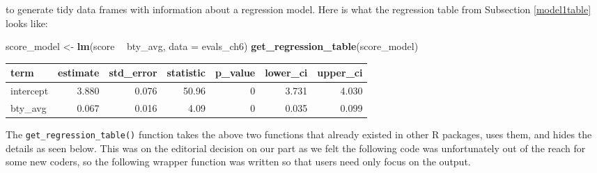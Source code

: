 \documentclass[12pt, krantz2,]{krantz}
\makeatletter
\newenvironment{Shaded}{\begin{snugshade}}{\end{snugshade}}
\newcommand{\DataTypeTok}[1]{\textcolor[rgb]{0.27,0.27,0.27}{#1}}
\newcommand{\DecValTok}[1]{\textcolor[rgb]{0.06,0.06,0.06}{#1}}
\newcommand{\KeywordTok}[1]{\textcolor[rgb]{0.27,0.27,0.27}{\textbf{#1}}}
\newcommand{\NormalTok}[1]{#1}
\newcommand{\OperatorTok}[1]{\textcolor[rgb]{0.43,0.43,0.43}{\textbf{#1}}}
\newcommand{\OtherTok}[1]{\textcolor[rgb]{0.37,0.37,0.37}{#1}}
\newcommand{\StringTok}[1]{\textcolor[rgb]{0.5,0.5,0.5}{#1}}
\newenvironment{kframe}{%
\medskip{}
\setlength{\fboxsep}{.8em}
 \def\at@end@of@kframe{}%
 \ifinner\ifhmode%
  \def\at@end@of@kframe{\end{minipage}}%
  \begin{minipage}{\columnwidth}%
 \fi\fi%
 \def\FrameCommand##1{\hskip\@totalleftmargin \hskip-\fboxsep
 \colorbox{shadecolor}{##1}\hskip-\fboxsep
     \hskip-\linewidth \hskip-\@totalleftmargin \hskip\columnwidth}%
 \MakeFramed {\advance\hsize-\width
   \@totalleftmargin\z@ \linewidth\hsize
   \@setminipage}}%
 {\par\unskip\endMakeFramed%
 \at@end@of@kframe}
\renewenvironment{Shaded}{\begin{kframe}}{\end{kframe}}
\makeatother
\begin{document}
to generate tidy data frames with information about a regression model. Here is what the regression table from Subsection \ref{model1table} looks like:

\begin{Shaded}
\begin{Highlighting}[]
\NormalTok{score_model <-}\StringTok{ }\KeywordTok{lm}\NormalTok{(score }\OperatorTok{~}\StringTok{ }\NormalTok{bty_avg, }\DataTypeTok{data =}\NormalTok{ evals_ch6)}
\KeywordTok{get_regression_table}\NormalTok{(score_model)}
\end{Highlighting}
\end{Shaded}

\begin{table}[H]
\centering\begingroup\fontsize{10}{12}\selectfont

\begin{tabular}{l|r|r|r|r|r|r}
\hline
term & estimate & std\_error & statistic & p\_value & lower\_ci & upper\_ci\\
\hline
intercept & 3.880 & 0.076 & 50.96 & 0 & 3.731 & 4.030\\
\hline
bty\_avg & 0.067 & 0.016 & 4.09 & 0 & 0.035 & 0.099\\
\hline
\end{tabular}
\endgroup{}
\end{table}

The \texttt{get\_regression\_table()} function takes the above two functions that already existed in other R packages, uses them, and hides the details as seen below. This was on the editorial decision on our part as we felt the following code was unfortunately out of the reach for some new coders, so the following wrapper function was written so that users need only focus on the output.

\begin{Shaded}
\end{Shaded}
\end{document}
